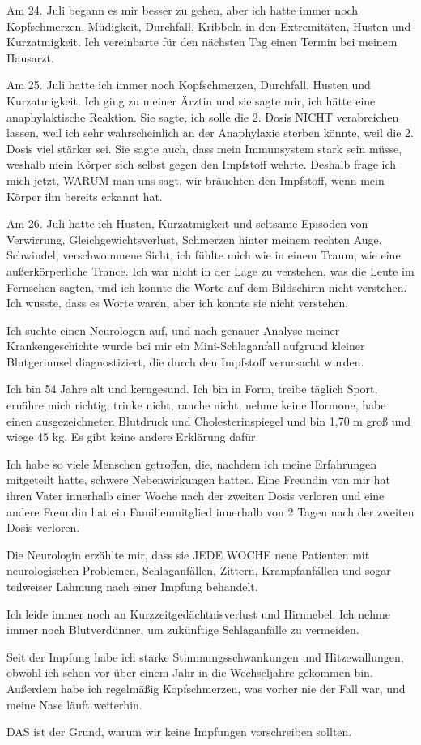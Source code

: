 Am 24. Juli begann es mir besser zu gehen, aber ich hatte immer noch
Kopfschmerzen, Müdigkeit, Durchfall, Kribbeln in den Extremitäten, Husten und
Kurzatmigkeit. Ich vereinbarte für den nächsten Tag einen Termin bei meinem
Hausarzt.

Am 25. Juli hatte ich immer noch Kopfschmerzen, Durchfall, Husten und
Kurzatmigkeit. Ich ging zu meiner Ärztin und sie sagte mir, ich hätte eine
anaphylaktische Reaktion. Sie sagte, ich solle die 2. Dosis NICHT verabreichen
lassen, weil ich sehr wahrscheinlich an der Anaphylaxie sterben könnte, weil die
2. Dosis viel stärker sei. Sie sagte auch, dass mein Immunsystem stark sein
müsse, weshalb mein Körper sich selbst gegen den Impfstoff wehrte. Deshalb frage
ich mich jetzt, WARUM man uns sagt, wir bräuchten den Impfstoff, wenn mein
Körper ihn bereits erkannt hat.

Am 26. Juli hatte ich Husten, Kurzatmigkeit und seltsame Episoden von
Verwirrung, Gleichgewichtsverlust, Schmerzen hinter meinem rechten Auge,
Schwindel, verschwommene Sicht, ich fühlte mich wie in einem Traum, wie eine
außerkörperliche Trance. Ich war nicht in der Lage zu verstehen, was die Leute
im Fernsehen sagten, und ich konnte die Worte auf dem Bildschirm nicht
verstehen. Ich wusste, dass es Worte waren, aber ich konnte sie nicht verstehen.

Ich suchte einen Neurologen auf, und nach genauer Analyse meiner
Krankengeschichte wurde bei mir ein Mini-Schlaganfall aufgrund kleiner
Blutgerinnsel diagnostiziert, die durch den Impfstoff verursacht wurden.

Ich bin 54 Jahre alt und kerngesund. Ich bin in Form, treibe täglich Sport,
ernähre mich richtig, trinke nicht, rauche nicht, nehme keine Hormone, habe
einen ausgezeichneten Blutdruck und Cholesterinspiegel und bin 1,70 m groß und
wiege 45 kg. Es gibt keine andere Erklärung dafür.

Ich habe so viele Menschen getroffen, die, nachdem ich meine Erfahrungen
mitgeteilt hatte, schwere Nebenwirkungen hatten. Eine Freundin von mir hat ihren
Vater innerhalb einer Woche nach der zweiten Dosis verloren und eine andere
Freundin hat ein Familienmitglied innerhalb von 2 Tagen nach der zweiten Dosis
verloren.

Die Neurologin erzählte mir, dass sie JEDE WOCHE neue Patienten mit
neurologischen Problemen, Schlaganfällen, Zittern, Krampfanfällen und sogar
teilweiser Lähmung nach einer Impfung behandelt.

Ich leide immer noch an Kurzzeitgedächtnisverlust und Hirnnebel. Ich nehme immer
noch Blutverdünner, um zukünftige Schlaganfälle zu vermeiden.

Seit der Impfung habe ich starke Stimmungsschwankungen und Hitzewallungen,
obwohl ich schon vor über einem Jahr in die Wechseljahre gekommen bin. Außerdem
habe ich regelmäßig Kopfschmerzen, was vorher nie der Fall war, und meine Nase
läuft weiterhin.

DAS ist der Grund, warum wir keine Impfungen vorschreiben sollten.
